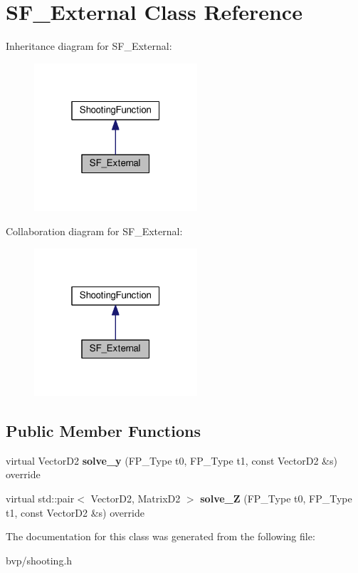 \hypertarget{classSF__External}{}\section{S\+F\+\_\+\+External Class Reference}
\label{classSF__External}


Inheritance diagram for S\+F\+\_\+\+External\+:\nopagebreak
\begin{figure}[H]
\begin{center}
\leavevmode
\includegraphics[width=172pt]{classSF__External__inherit__graph}
\end{center}
\end{figure}


Collaboration diagram for S\+F\+\_\+\+External\+:\nopagebreak
\begin{figure}[H]
\begin{center}
\leavevmode
\includegraphics[width=172pt]{classSF__External__coll__graph}
\end{center}
\end{figure}
\subsection*{Public Member Functions}
\begin{DoxyCompactItemize}
\item 
\mbox{\label{classSF__External_a2784bff6605875c27eec93229e880cc4}} 
virtual Vector\+D2 {\bfseries solve\+\_\+y} (F\+P\+\_\+\+Type t0, F\+P\+\_\+\+Type t1, const Vector\+D2 \&s) override
\item 
\mbox{\label{classSF__External_a625034aab5dd1bc60d9472095058d478}} 
virtual std\+::pair$<$ Vector\+D2, Matrix\+D2 $>$ {\bfseries solve\+\_\+Z} (F\+P\+\_\+\+Type t0, F\+P\+\_\+\+Type t1, const Vector\+D2 \&s) override
\end{DoxyCompactItemize}


The documentation for this class was generated from the following file\+:\begin{DoxyCompactItemize}
\item 
bvp/shooting.\+h\end{DoxyCompactItemize}
